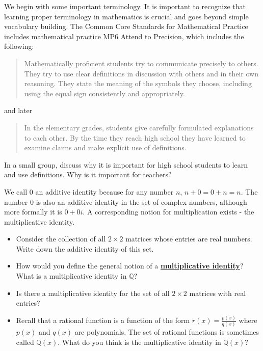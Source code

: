 \documentclass[11pt]{article}
\newenvironment{task}
	{\begin{mdframed}[linecolor=lightgray, linewidth=3pt]\raggedright}
	{\end{mdframed}}
\renewcommand\emph[1]{\underline{\bf{#1}}} %
\theoremstyle{definition}
\begin{document}
We begin with some important terminology. It is important to recognize that learning proper terminology in mathematics is crucial and goes beyond simple vocabulary 
building. The Common Core Standards for Mathematical Practice includes mathematical practice MP6 Attend to Precision, which includes the following:

\begin{quote}
Mathematically proficient students try to communicate precisely to others. They try to use clear definitions in discussion with others and in their own reasoning. 
They state the meaning of the symbols they choose, including using the equal sign consistently and appropriately. 
\end{quote}
and later
\begin{quote}
In the elementary grades, students give carefully formulated explanations to each other. By the time they reach high school they have learned to examine claims and make explicit use of definitions.
\end{quote}

\begin{task}
  In a small group, discuss why it is important for high school students to learn and use definitions. Why is it important for teachers?
\end{task}

We call $0$ an additive identity because for any number $n$, $n+0 = 0 + n = n$. The number $0$ is also an additive identity in the set of complex numbers,
although more formally it is $0+0i$. A corresponding notion for multiplication exists - the multiplicative identity.

\begin{task}
  \begin{itemize}
    \item Consider the collection of all $2\times 2$ matrices whose entries are real numbers. Write down the additive identity of this set.
    \item How would you define the general notion of a \emph{multiplicative identity}? What is a multiplicative identity in $\mathbb{Q}$?
    \item Is there a multiplicative identity for the set of all $2\times 2$ matrices with real entries?
    \item Recall that a rational function is a function of the form $r(x) = \frac{p(x)}{q(x)}$ where $p(x)$ and $q(x)$ are polynomials. The set
      of rational functions is sometimes called $\mathbb{Q}(x)$. What do you think is the multiplicative identity in $\mathbb{Q}(x)$?
  \end{itemize}
\end{task}
\end{document}
